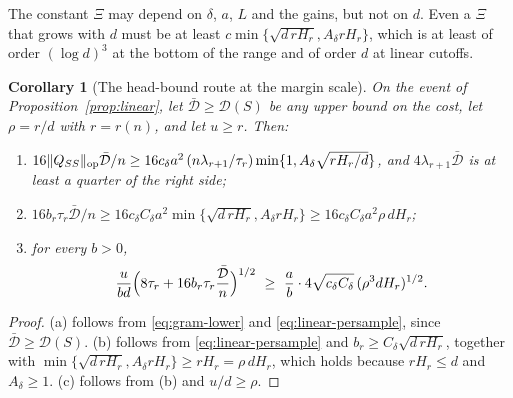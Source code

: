 \documentclass[11pt]{article}
\newtheorem{corollary}[theorem]{Corollary}
\theoremstyle{definition}\newtheorem{assumption}[theorem]{Assumption}
\theoremstyle{remark}\newtheorem{remark}[theorem]{Remark}
\begin{document}
The constant $\Xi$ may depend on $\delta$, $a$, $L$ and the gains, but not on
$d$. Even a $\Xi$ that grows with $d$ must be at least
$c\min\{\sqrt{d\,rH_r},A_\delta rH_r\}$, which is at least of order
$(\log d)^3$ at the bottom of the range and of order $d$ at linear cutoffs.

\begin{corollary}[The head-bound route at the margin scale]\label{cor:route}
On the event of Proposition~\ref{prop:linear}, let
$\bar{\mathcal D}\ge\mathcal D(S)$ be any upper bound on the cost, let
$\rho=r/d$ with $r=r(n)$, and let $u\ge r$. Then:
\begin{enumerate}
\item[(a)] $16\|Q_{SS}\|_{\rm op}\bar{\mathcal D}/n\ge16c_\delta a^2\,
(n\lambda_{r+1}/\tau_r)\min\{1,A_\delta\sqrt{rH_r/d}\}$, and
$4\lambda_{r+1}\bar{\mathcal D}$ is at least a quarter of the right side;
\item[(b)] $16b_r\tau_r\bar{\mathcal D}/n\ge16c_\delta C_\delta a^2
\min\{\sqrt{d\,rH_r},A_\delta rH_r\}\ge16c_\delta C_\delta a^2\rho\,dH_r$;
\item[(c)] for every $b>0$,
\[
 \frac u{bd}\Bigl(8\tau_r+16b_r\tau_r\frac{\bar{\mathcal D}}n\Bigr)^{1/2}
 \ \ge\ \frac ab\cdot4\sqrt{c_\delta C_\delta}\,(\rho^3dH_r)^{1/2}.
\]
\end{enumerate}
\end{corollary}
\begin{proof}
(a) follows from \eqref{eq:gram-lower} and \eqref{eq:linear-persample},
since $\bar{\mathcal D}\ge\mathcal D(S)$. (b) follows from
\eqref{eq:linear-persample} and $b_r\ge C_\delta\sqrt{d\,rH_r}$, together
with $\min\{\sqrt{d\,rH_r},A_\delta rH_r\}\ge rH_r=\rho\,dH_r$, which holds
because $rH_r\le d$ and $A_\delta\ge1$. (c) follows from (b) and
$u/d\ge\rho$.
\end{proof}
\end{document}
